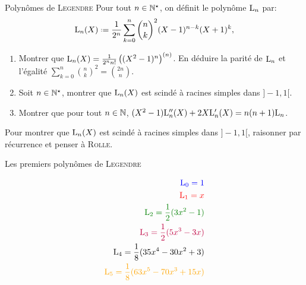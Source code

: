 \begin{defi}{Polynômes de \textsc{Legendre}}
    Pour tout $n \in \mathbb{N}^\star$, on définit le polynôme $\mathrm{L}_n$ par:
    $$\Leg_n(X) \defeq \frac{1}{2^n} \sum_{k=0}^{n} \binom{n}{k}^2 (X-1)^{n-k}(X+1)^{k},$$
\end{defi}


\begin{exercice}
    \begin{enumerate}
        \item Montrer que $\mathrm{L}_n(X) = \frac{1}{2^n n!} \left( (X^2-1)^n \right)^{(n)}$. En déduire la parité de $\mathrm{L}_n$ et l'égalité $\sum\limits_{k=0}^n \binom{n}{k}^2 = \binom{2n}{n}$.
        \item Soit $n \in \mathbb{N}^\star$, montrer que $\mathrm{L}_n(X)$ est scindé à racines simples dans $]-1, 1[$. 
        \item Montrer que pour tout $n \in \mathbb{N}$, $(X^2-1) \mathrm{L}''_n(X) + 2X \mathrm{L}'_n(X) = n(n+1) \mathrm{L}_n$.
    \end{enumerate}
\end{exercice}  

\begin{elem_sol}
    Pour montrer que $\mathrm{L}_n(X)$ est scindé à racines simples dans $]-1, 1[$, raisonner par récurrence et penser à \textsc{Rolle}. 
\end{elem_sol}

\begin{marginfigure}[-11.5cm]
    \centering
	
	\caption*{\centering Les premiers polynômes de \textsc{Legendre}}
	\small
	\begin{align*}
	    \color{blue} \Leg_0 = 1 \\
	    \color{red} \Leg_1 = x \\
	    \color{green} \Leg_2 = \frac{1}{2}(3x^2-1) \\
	    \color{purple} \Leg_3 = \frac{1}{2}(5x^3-3x) \\
	    \color{black} \Leg_4 = \frac{1}{8}(35x^4-30x^2+3) \\
	    \color{orange} \Leg_5 = \frac{1}{8}(63x^5-70x^3+15x)
	\end{align*}
\end{marginfigure}

